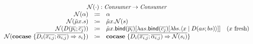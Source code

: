 \[\begin{array}{rcll}
    \\
    \multicolumn{4}{c}{\name{\cdot} : \emph{Consumer} \rightarrow \emph{Consumer}}\\
    \name{\alpha} & \coloneq & \alpha & \\
    \name{\tilde{\mu}x.s} & \coloneq & \tilde{\mu}x.\name{s} & \\
    \name{D(\overline{p_i}; \overline{c_j})} & \coloneq & \tilde{\mu}x.\bind{\overline{p_i}}{\lambda as.\bind{\overline{c_j}}{\lambda bs.\cut{x}{D(as; bs)}}} & \fresh{x} \\
    \name{\cocase{\overline{D_i(\overline{x_{i,j}}; \overline{\alpha_{i,j}}) \Rightarrow s_i}}} & \coloneq & \cocase{\overline{D_i(\overline{x_{i,j}}; \overline{\alpha_{i,j}}) \Rightarrow \name{s_i}}} & \\
  \end{array}
\]

